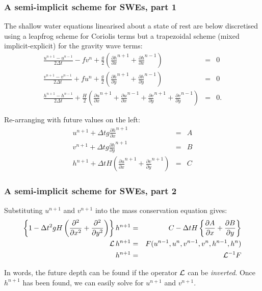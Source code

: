 \documentclass[xcolor=dvipsnames]{beamer} %
\newcommand{\BSS}{ \begin{scriptsize}}
\newcommand{\ESS}{ \end{scriptsize}}
\newcommand{\partd}[2]{\frac{\partial #1}{\partial #2}}
\begin{document}
\frame
{
	\frametitle{A semi-implicit scheme for SWEs, part 1}
	\BSS

The shallow water equations linearised about a state of rest are below
discretised using a leapfrog scheme for Coriolis terms but a
trapezoidal scheme (mixed implicit-explicit) for the gravity wave
terms:
\begin{eqnarray*}
	\frac{u^{n+1}-u^{n-1}}{2\Delta t}-fv^n+\frac{g}{2}
	\left( \partd{h}{x}^{n+1} +\partd{h}{x}^{n-1} \right) & = & 0 \\
	\frac{v^{n+1}-v^{n-1}}{2\Delta t}+fu^n+\frac{g}{2}
	\left( \partd{h}{y}^{n+1} +\partd{h}{y}^{n-1} \right) & = & 0 \\
	\frac{h^{n+1}-h^{n-1}}{2\Delta t}+\frac{H}{2}
	\left( \partd{u}{x}^{n+1} +\partd{u}{x}^{n-1}
	+\partd{v}{y}^{n+1} +\partd{v}{y}^{n-1} 
	\right) & = & 0. 
\end{eqnarray*}

Re-arranging with future values on the left:
\begin{eqnarray*}
	u^{n+1}+\Delta t g \partd{h}{x}^{n+1} & = & A \\
	v^{n+1}+\Delta t g \partd{h}{y}^{n+1} & = & B \\
	h^{n+1}+\Delta t H \left( \partd{u}{x}^{n+1}+\partd{v}{y}^{n+1} \right) & = & C
\end{eqnarray*}


\ESS
}

\frame
{
	\frametitle{A semi-implicit scheme for SWEs, part 2}
	\BSS
Substituting $u^{n+1}$ and $v^{n+1}$ into the mass conservation
equation gives:
\begin{eqnarray*}
	\left\{ 1-\Delta t^2 gH \left( \partd{^2}{x^2}+\partd{^2}{y^2} \right) 
	\right\} h^{n+1}
	& = & C-\Delta t H \left\{ \partd{A}{x}+\partd{B}{y} \right\} \\
	{\cal L}\,h^{n+1} & = & F(u^{n-1},u^n,v^{n-1},v^n,h^{n-1},h^n) \\
	h^{n+1} & = & {\cal L}^{-1} F
\end{eqnarray*}

In words, the future depth can be found if the operator $\cal{L}$ can be
{\em inverted}. Once $h^{n+1}$ has been found, we can easily solve for
$u^{n+1}$ and $v^{n+1}$. 
	
	\ESS
}
\end{document}
